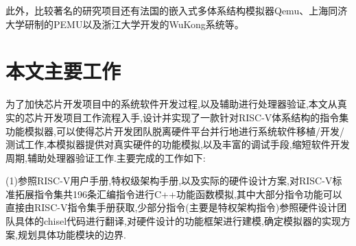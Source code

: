 

此外，比较著名的研究项目还有法国的嵌入式多体系结构模拟器Qemu\cite{bellard2005qemu}、上海同济大学研制的PEMU\cite{huang}以及浙江大学开发的WuKong系统\cite{wukong}等。


\section{本文主要工作}
为了加快芯片开发项目中的系统软件开发过程,以及辅助进行处理器验证\cite{asaad2012cycle,chaix2019implementation},本文从真实的芯片开发项目工作流程入手,设计并实现了一款针对RISC-V体系结构的指令集功能模拟器,可以使得芯片开发团队脱离硬件平台并行地进行系统软件移植/开发/测试工作\cite{magnusson2002simics,ceze2003full,boh,varga2010omnet,许鹏2006一种应用于嵌入式系统中断控制},本模拟器提供对真实硬件的功能模拟,以及丰富的调试手段,缩短软件开发周期,辅助处理器验证工作.主要完成的工作如下:


(1)参照RISC-V用户手册,特权级架构手册,以及实际的硬件设计方案,对RISC-V标准拓展指令集共196条汇编指令进行C++功能函数模拟,其中大部分指令功能可以直接由RISC-V指令集手册获取,少部分指令(主要是特权架构指令)参照硬件设计团队具体的chisel代码进行翻译,对硬件设计的功能框架进行建模,确定模拟器的实现方案,规划具体功能模块的边界.


